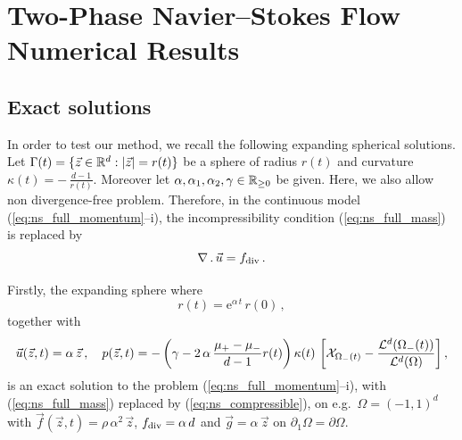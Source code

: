 \chapter{\sc Two-Phase Navier--Stokes Flow Numerical Results}
\label{ch:ns_results}

\section{Exact solutions}\label{sec:ns_exact_solutions}
In order to test our method, we recall the following expanding spherical
solutions. Let $\Gamma(t) = \{ \vec z \in \mathbb R^d : |\vec z| = r(t)\}$ be a sphere
of radius $r(t)$ and curvature $\kappa(t) = -\,\frac{d-1}{r(t)}$. Moreover let
$\alpha,\alpha_1,\alpha_2,\gamma\in \mathbb R_{\geq 0}$ be given. Here, we also allow
non divergence-free problem. Therefore, in the continuous model
(\ref{eq:ns_full_momentum}--i), the incompressibility condition
(\ref{eq:ns_full_mass}) is replaced by
\begin{equation}\label{eq:ns_compressible}
\nabla\,.\,\vec u = f_{\rm{div}}\,.
\end{equation}

Firstly, the expanding sphere where
\begin{equation} \label{eq:r_benchmark1}
r(t) = \mathrm{e}^{\alpha\,t}\,r(0)\,,
\end{equation}
together with
\begin{equation} \label{eq:up_benchmark1}
\vec u(\vec z, t) = \alpha\,\vec z \,, \quad
p(\vec z, t) = -\,\bigg(\gamma - 2\,\alpha\,\frac{\mu_+ - \mu_-}
{d-1}r(t)\bigg)\,\kappa(t)\,\left[ \mathrm{\mathcal{X}}_{\Omega_-(t)} -
\frac{\mathcal{L}^d(\Omega_-(t))}{\mathcal{L}^d(\Omega)}\right],
\end{equation}
is an exact solution to the problem (\ref{eq:ns_full_momentum}--i), with
(\ref{eq:ns_full_mass}) replaced by (\ref{eq:ns_compressible}), on
e.g.\ $\Omega = (-1,1)^d$  with $\vec f(\vec z, t) = \rho\,\alpha^2\,\vec z$,
$f_{\rm{div}} = \alpha\,d$ and $\vec g = \alpha\,\vec z$ on
$\partial_1\Omega=\partial\Omega$.

